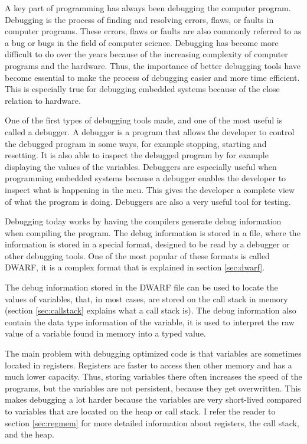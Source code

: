 
A key part of programming has always been debugging the computer program.
Debugging is the process of finding and resolving errors, flaws, or faults in computer programs.
These errors, flaws or faults are also commonly referred to as a bug or bugs in the field of computer science.
Debugging has become more difficult to do over the years because of the increasing complexity of computer programs and the hardware.
Thus, the importance of better debugging tools have become essential to make the process of debugging easier and more time efficient.
This is especially true for debugging  embedded systems because of the close relation to hardware.


One of the first types of debugging tools made, and one of the most useful is called a debugger.
A debugger is a program that allows the developer to control the debugged program in some ways, for example stopping, starting and resetting.
It is also able to inspect the debugged program by for example displaying the values of the variables.
Debuggers are especially useful when programming embedded systems because a debugger enables the developer to inspect what is happening in the \gls{mcu}.
This gives the developer a complete view of what the program is doing.
Debuggers are also a very useful tool for testing.


Debugging today works by having the compilers generate debug information when compiling the program.
The debug information is stored in a file, where the information is stored in a special format, designed to be read by a debugger or other debugging tools.
One of the most popular of these formats is called \gls{DWARF}, it is a complex format that is explained in section \ref{sec:dwarf}.


The debug information stored in the \gls{DWARF} file can be used to locate the values of variables, that, in most cases, are stored on the call stack in memory (section \ref{sec:callstack} explains what a call stack is).
The debug information also contain the data type information of the variable, it is used to interpret the raw value of a variable found in memory into a typed value.


The main problem with debugging optimized code is that variables are sometimes located in registers.
Registers are faster to access then other memory and has a much lower capacity.
Thus, storing variables there often increases the speed of the programs, but the variables are not persistent, because they get overwritten.
This makes debugging a lot harder because the variables are very short-lived compared to variables that are located on the heap or call stack.
I refer the reader to section \ref{sec:regmem} for more detailed information about registers, the call stack, and the heap.


